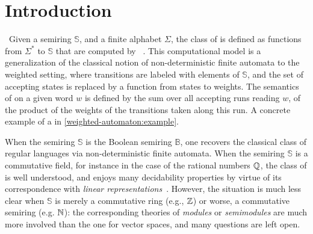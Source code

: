 
\section{Introduction}\label{introduction:sec}

\AP\ Given a semiring $\mathbb{S}$, and a finite alphabet $\Sigma$, the class
of  is defined as
functions from $\Sigma^*$ to $\mathbb{S}$ that are computed by
~\cite[Chapter~1]{BERE10}. This computational model is
a generalization of the classical notion of non-deterministic finite automata
to the weighted setting, where transitions are labeled with elements of
$\mathbb{S}$, and the set of accepting states is replaced by a function from
states to weights. The semantics of  on a
given word $w$ is defined by the sum over all accepting runs reading $w$, of
the product of the weights of the transitions taken along this run. A 
concrete example of a  in
\cref{weighted-automaton:example}.

When the semiring $\mathbb{S}$ is the Boolean semiring $\mathbb{B}$, one
recovers the classical class of regular languages via non-deterministic finite
automata. When the semiring $\mathbb{S}$ is a commutative field, for instance
in the case of the rational numbers $\mathbb{Q}$, the class of
 is well understood, and enjoys many
decidability properties by virtue of its correspondence with \emph{linear
representations}~\cite[Theorem 7.1]{BERE10}. However, the situation is much less clear when
$\mathbb{S}$ is merely a commutative ring  (e.g., $\mathbb{Z}$) or worse, a
commutative semiring (e.g. $\mathbb{N}$): the corresponding theories of \emph{modules}
or \emph{semimodules} are much more involved than the one for vector spaces,
and many questions are left open. 

